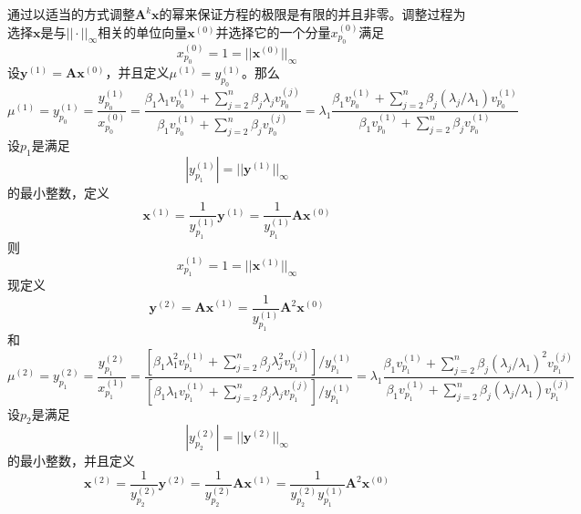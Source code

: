 \documentclass[12pt]{ctexart}
\begin{document}
	通过以适当的方式调整$\mathbf{A}^k\mathbf{x}$的幂来保证方程的极限是有限的并且非零。调整过程为选择$\mathbf{x}$是与$||\cdot||_{\infty}$相关的单位向量$\mathbf{x}^{(0)}$并选择它的一个分量$x_{p_0}^{(0)}$满足
	\begin{equation*}
	x_{p_0}^{(0)}=1=||\mathbf{x}^{(0)}||_{\infty}
	\end{equation*}
	设$\mathbf{y}^{(1)}=\mathbf{A}\mathbf{x}^{(0)}$，并且定义$\mu^{(1)}=y_{p_0}^{(1)}$。那么
	\begin{equation*}
	\mu^{(1)}=y_{p_0}^{(1)}=\frac{y_{p_0}^{(1)}}{x_{p_0}^{(0)}}=\frac{\beta_1\lambda_1v_{p_0}^{(1)}+\sum\limits_{j=2}^{n}\beta_j\lambda_jv_{p_0}^{(j)}}{\beta_1v_{p_0}^{(1)}+\sum\limits_{j=2}^{n}\beta_jv_{p_0}^{(j)}}=\lambda_1\frac{\beta_1v_{p_0}^{(1)}+\sum\limits_{j=2}^{n}\beta_j(\lambda_j/\lambda_1)v_{p_0}^{(1)}}{\beta_1v_{p_0}^{(1)}+\sum\limits_{j=2}^{n}\beta_jv_{p_0}^{(1)}}
	\end{equation*}
	设$p_1$是满足
	\begin{equation*}
	|y_{p_1}^{(1)}|=||\mathbf{y}^{(1)}||_\infty
	\end{equation*}
	的最小整数，定义
	\begin{equation*}
	\mathbf{x}^{(1)}=\frac{1}{y_{p_1}^{(1)}}\mathbf{y}^{(1)}=\frac{1}{y_{p_1}^{(1)}}\mathbf{A}\mathbf{x}^{(0)}
	\end{equation*}
	则
	\begin{equation*}
	x_{p_1}^{(1)}=1=||\mathbf{x}^{(1)}||_\infty
	\end{equation*}
	现定义
	\begin{equation*}
	\mathbf{y}^{(2)}=\mathbf{Ax}^{(1)}=\frac{1}{y_{p_1}^{(1)}}\mathbf{A}^{2}\mathbf{x}^{(0)}
	\end{equation*}
	和
	\begin{equation*}
	\mu^{(2)}=y_{p_1}^{(2)}=\frac{y_{p_1}^{(2)}}{x_{p_1}^{(1)}}=\frac{[\beta_1\lambda_1^2v_{p_1}^{(1)}+\sum\limits_{j=2}^{n}\beta_j\lambda_j^2v_{p_1}^{(j)}]/y_{p_1}^{(1)}}{[\beta_1\lambda_1v_{p_1}^{(1)}+\sum\limits_{j=2}^{n}\beta_j\lambda_jv_{p_1}^{(j)}]/y_{p_1}^{(1)}}=\lambda_1\frac{\beta_1v_{p_1}^{(1)}+\sum\limits_{j=2}^{n}\beta_j(\lambda_j/\lambda_1)^2v_{p_1}^{(j)}}{\beta_1v_{p_1}^{(1)}+\sum\limits_{j=2}^{n}\beta_j(\lambda_j/\lambda_1)v_{p_1}^{(j)}}
	\end{equation*}
	设$p_2$是满足
	\begin{equation*}
	|y_{p_2}^{(2)}|=||\mathbf{y}^{(2)}||_\infty
	\end{equation*}
	的最小整数，并且定义
	\begin{equation*}
	\mathbf{x}^{(2)}=\frac{1}{y_{p_2}^{(2)}}\mathbf{y}^{(2)}=\frac{1}{y_{p_2}^{(2)}}\mathbf{A}\mathbf{x}^{(1)}=\frac{1}{y_{p_2}^{(2)}y_{p_1}^{(1)}}\mathbf{A}^2\mathbf{x}^{(0)}
	\end{equation*}
\end{document}
